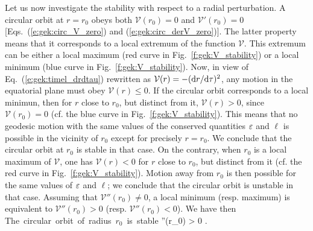 Let us now investigate the stability with respect to a radial perturbation.
A circular orbit at $r=r_0$ obeys both $\mathcal{V}(r_0) = 0$ and $\mathcal{V}'(r_0) = 0$
[Eqs.~(\ref{e:gek:circ_V_zero}) and (\ref{e:gek:circ_derV_zero})]. The latter property means that
it corresponds to a local extremum of the function $\mathcal{V}$. This extremum can be either
a local maximum (red curve in Fig.~\ref{f:gek:V_stability}) or a local minimum
(blue curve in Fig.~\ref{f:gek:V_stability}).
Now, in view of Eq.~(\ref{e:gek:timel_drdtau}) rewritten as $\mathcal{V}(r) = - (\mathrm{d} r/ \mathrm{d}\tau)^2$, any motion in the equatorial plane must obey $\mathcal{V}(r) \leq 0$. If the circular orbit
corresponds to a local minimun, then for $r$ close to $r_0$, but distinct from it,
$\mathcal{V}(r) > 0$, since $\mathcal{V}(r_0) = 0$ (cf. the blue curve in Fig.~\ref{f:gek:V_stability}). This means that no geodesic motion with the same values of the
conserved quantities $\varepsilon$ and $\ell$
is possible in the vicinity of $r_0$ except for precisely $r=r_0$. We conclude that the circular orbit at $r_0$ is stable in that case.
On the contrary, when $r_0$ is a local maximum of $\mathcal{V}$, one has
$\mathcal{V}(r) < 0$
for $r$ close to $r_0$, but distinct from it (cf. the red curve in Fig.~\ref{f:gek:V_stability}).
Motion away from $r_0$ is then possible for the same values of $\varepsilon$ and $\ell$; we conclude that the circular orbit is unstable in that
case. Assuming that $\mathcal{V}''(r_0)\neq 0$, a local minimum (resp. maximum) is equivalent to
$\mathcal{V}''(r_0) > 0$ (resp. $\mathcal{V}''(r_0) < 0$). We have then
\be \label{e:gek:stability_circ_V}
    \mbox{The circular orbit of radius $r_0$ is stable} \iff
    ''(r_0) > 0 .
\ee

